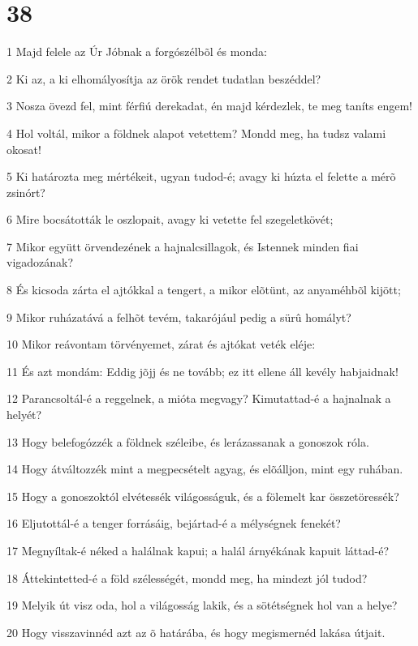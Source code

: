 \chapter{38}

\par 1 Majd felele az Úr Jóbnak a forgószélbõl és monda:
\par 2 Ki az, a ki elhomályosítja az örök rendet tudatlan beszéddel?
\par 3 Nosza övezd fel, mint férfiú derekadat, én majd kérdezlek, te meg taníts engem!
\par 4 Hol voltál, mikor a földnek alapot vetettem? Mondd meg, ha tudsz valami okosat!
\par 5 Ki határozta meg mértékeit, ugyan tudod-é; avagy ki húzta el felette a mérõ zsinórt?
\par 6 Mire bocsátották le oszlopait, avagy ki vetette fel szegeletkövét;
\par 7 Mikor együtt örvendezének a hajnalcsillagok, és Istennek minden fiai vigadozának?
\par 8 És kicsoda zárta el ajtókkal a tengert, a mikor elõtünt, az anyaméhbõl kijött;
\par 9 Mikor ruházatává a felhõt tevém, takarójául pedig a sürû homályt?
\par 10 Mikor reávontam törvényemet, zárat és ajtókat veték eléje:
\par 11 És azt mondám: Eddig jõjj és ne tovább; ez itt ellene áll kevély habjaidnak!
\par 12 Parancsoltál-é a reggelnek, a mióta megvagy? Kimutattad-é a hajnalnak a helyét?
\par 13 Hogy belefogózzék a földnek széleibe, és lerázassanak a gonoszok róla.
\par 14 Hogy átváltozzék mint a megpecsételt agyag, és elõálljon, mint egy ruhában.
\par 15 Hogy a gonoszoktól elvétessék világosságuk, és a fölemelt  kar összetöressék?
\par 16 Eljutottál-é a tenger forrásáig, bejártad-é a mélységnek fenekét?
\par 17 Megnyíltak-é néked a halálnak kapui; a halál árnyékának kapuit láttad-é?
\par 18 Áttekintetted-é a föld szélességét, mondd meg, ha mindezt jól tudod?
\par 19 Melyik út visz oda, hol a világosság lakik, és a sötétségnek hol van a helye?
\par 20 Hogy visszavinnéd azt az õ határába, és hogy megismernéd lakása útjait.
